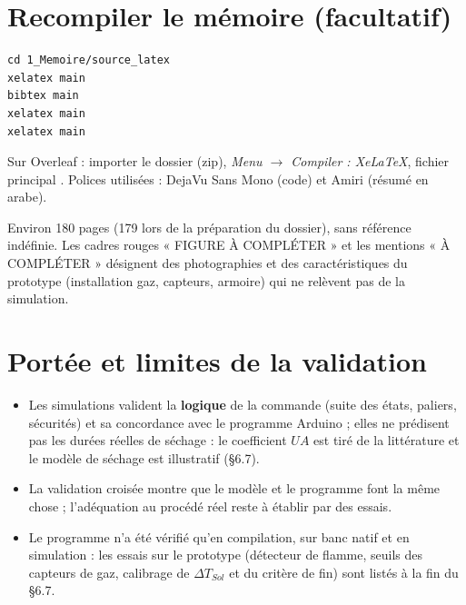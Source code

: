 \documentclass[11pt,a4paper]{article}
\newcommand{\code}[1]{\texttt{\detokenize{#1}}}
\begin{document}
\section{Recompiler le mémoire (facultatif)}

\begin{commande}
\begin{Verbatim}
cd 1_Memoire/source_latex
xelatex main
bibtex main
xelatex main
xelatex main
\end{Verbatim}
\end{commande}
Sur Overleaf : importer le dossier \code{source_latex} (zip), \emph{Menu
$\rightarrow$ Compiler : XeLaTeX}, fichier principal \code{main.tex}. Polices
utilisées : DejaVu Sans Mono (code) et Amiri (résumé en arabe).

\begin{attendu}
Environ 180 pages (179 lors de la préparation du dossier), sans référence indéfinie.
Les cadres rouges « FIGURE À COMPLÉTER » et les mentions « À COMPLÉTER »
désignent des photographies et des caractéristiques du prototype
(installation gaz, capteurs, armoire) qui ne relèvent pas de la simulation.
\end{attendu}

\section{Portée et limites de la validation}

\begin{itemize}
\item Les simulations valident la \textbf{logique} de la commande (suite des
  états, paliers, sécurités) et sa concordance avec le programme Arduino ; elles
  ne prédisent pas les durées réelles de séchage : le coefficient $UA$ est tiré
  de la littérature et le modèle de séchage est illustratif (§6.7).
\item La validation croisée montre que le modèle et le programme font la
  même chose ; l'adéquation au procédé réel reste à établir par des essais.
\item Le programme n'a été vérifié qu'en compilation, sur banc natif et en
  simulation : les essais sur le prototype (détecteur de flamme, seuils des
  capteurs de gaz, calibrage de $\Delta T_{Sol}$ et du critère de fin) sont
  listés à la fin du §6.7.
\end{itemize}
\end{document}
